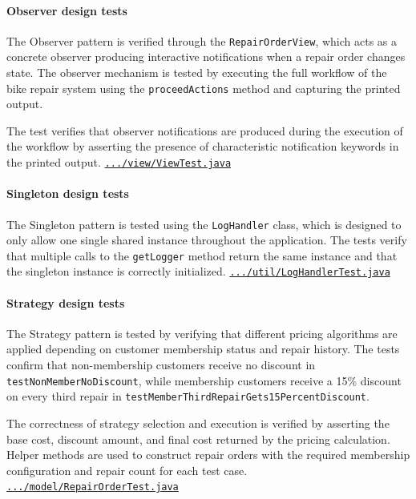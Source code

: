 \documentclass[a4paper]{scrartcl}
\begin{document}
\paragraph{Observer design tests}

The Observer pattern is verified through the \texttt{RepairOrderView}, which acts as a concrete observer producing interactive notifications when a repair order changes state. The observer mechanism is tested by executing the full workflow of the bike repair system using the \texttt{proceedActions} method and capturing the printed output.

The test verifies that observer notifications are produced during the execution of the workflow by asserting the presence of characteristic notification keywords in the printed output. \href{https://github.com/mo-mosverkstad/java-learning/blob/183fd32417c1e32630f41e821e872cda2c43eda9/maven-projects/ElectricBikeRepair/src/test/java/se/ebikerepair/view/ViewTest.java}{\nolinkurl{.../view/ViewTest.java}} \cite{sourcecode}

\paragraph{Singleton design tests}

The Singleton pattern is tested using the \texttt{LogHandler} class, which is designed to only allow one single shared instance throughout the application. The tests verify that multiple calls to the \texttt{getLogger} method return the same instance and that the singleton instance is correctly initialized. \href{https://github.com/mo-mosverkstad/java-learning/blob/183fd32417c1e32630f41e821e872cda2c43eda9/maven-projects/ElectricBikeRepair/src/test/java/se/ebikerepair/util/LogHandlerTest.java}{\nolinkurl{.../util/LogHandlerTest.java}} \cite{sourcecode}

\paragraph{Strategy design tests}

The Strategy pattern is tested by verifying that different pricing algorithms are applied depending on customer membership status and repair history. The tests confirm that non-membership customers receive no discount in \texttt{testNonMemberNoDiscount}, while membership customers receive a 15\% discount on every third repair in \texttt{testMemberThirdRepairGets15PercentDiscount}.

The correctness of strategy selection and execution is verified by asserting the base cost, discount amount, and final cost returned by the pricing calculation. Helper methods are used to construct repair orders with the required membership configuration and repair count for each test case. \href{https://github.com/mo-mosverkstad/java-learning/blob/183fd32417c1e32630f41e821e872cda2c43eda9/maven-projects/ElectricBikeRepair/src/test/java/se/ebikerepair/model/RepairOrderTest.java}{\nolinkurl{.../model/RepairOrderTest.java}} \cite{sourcecode}
\end{document}
